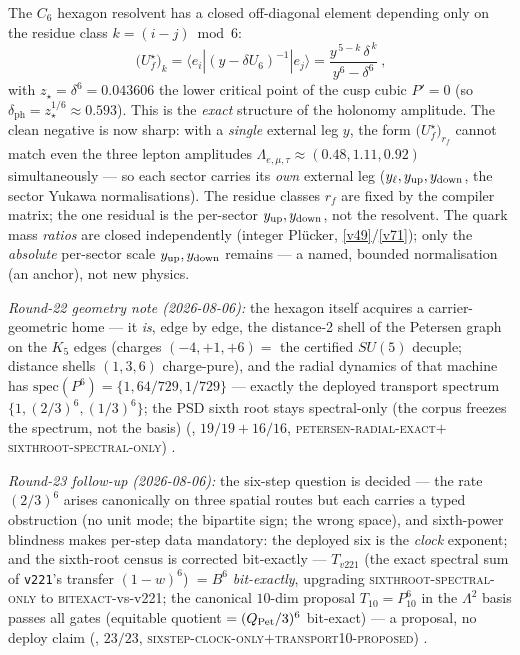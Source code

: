 \documentclass[11pt,a4paper]{article}
\theoremstyle{definition}
\begin{document}
\begin{winbox}
The $C_6$ hexagon resolvent has a closed off-diagonal element depending only on the residue class
$k=(i{-}j)\bmod 6$:
\[
  \boxed{\ \big(U_f^\star\big)_k=\langle e_i|(y-\delta U_6)^{-1}|e_j\rangle
  =\frac{y^{\,5-k}\,\delta^{\,k}}{y^{6}-\delta^{6}}\ },
\]
with $z_\star=\delta^6=0.043606$ the lower critical point of the cusp cubic $P'{=}0$ (so
$\delta_{\mathrm{ph}}=z_\star^{1/6}\approx0.593$).
This is the \emph{exact} structure of the holonomy amplitude. The clean negative is now sharp: with a
\emph{single} external leg $y$, the form $\big(U_f^\star\big)_{r_f}$ cannot match even the three lepton
amplitudes $\Lambda_{e,\mu,\tau}\approx(0.48,1.11,0.92)$ simultaneously --- so each sector carries its
\emph{own} external leg ($y_\ell,y_{\rm up},y_{\rm down}$, the sector Yukawa normalisations). The residue
classes $r_f$ are fixed by the compiler matrix; the one residual is the per-sector $y_{\rm up},y_{\rm down}$,
not the resolvent. The quark mass \emph{ratios} are closed independently (integer Pl\"ucker, \vref{v49}/\vref{v71}); only
the \emph{absolute} per-sector scale $y_{\rm up},y_{\rm down}$ remains --- a named, bounded normalisation
(an anchor), not new physics. \mO
\par\smallskip\noindent\emph{Round-22 geometry note (2026-08-06):} the hexagon itself acquires a
carrier-geometric home --- it \emph{is}, edge by edge, the distance-2 shell of the Petersen graph
on the $K_5$ edges (charges $(-4,+1,+6)=$ the certified $SU(5)$ decuple; distance shells $(1,3,6)$
charge-pure), and the radial dynamics of that machine has
$\mathrm{spec}(P^6)=\{1,64/729,1/729\}$ --- exactly the deployed transport spectrum
$\{1,(2/3)^6,(1/3)^6\}$; the PSD sixth root stays spectral-only (the corpus freezes the spectrum,
not the basis) (, $19/19+16/16$,
\textsc{petersen-radial-exact}$+$\textsc{sixthroot-spectral-only}) \mE.
\par\smallskip\noindent\emph{Round-23 follow-up (2026-08-06):} the six-step question is decided
--- the rate $(2/3)^6$ arises canonically on three spatial routes but each carries a typed
obstruction (no unit mode; the bipartite sign; the wrong space), and sixth-power blindness makes
per-step data mandatory: the deployed six is the \emph{clock} exponent; and the sixth-root
census is corrected bit-exactly --- $T_{v221}$ (the exact spectral sum of \texttt{v221}'s
transfer $(1-w)^6$) $=B^6$ \emph{bit-exactly}, upgrading \textsc{sixthroot-spectral-only} to
\textsc{bitexact}-vs-v221; the canonical $10$-dim proposal $T_{10}=P_{10}^6$ in the $\Lambda^2$
basis passes all gates (equitable quotient $=(Q_{\rm Pet}/3)^6$ bit-exact) --- a proposal, no
deploy claim (, $23/23$,
\textsc{sixstep-clock-only}$+$\textsc{transport10-proposed}) \mE.
\end{winbox}
\end{document}
